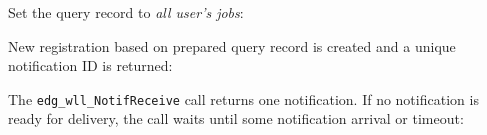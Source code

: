 Set the query record to \emph{all user's jobs}:


New registration based on prepared query record is created and a
unique notification ID is returned: 


The \verb'edg_wll_NotifReceive' call returns one notification. If no notification is 
ready for delivery, the call waits until some notification arrival or timeout:



